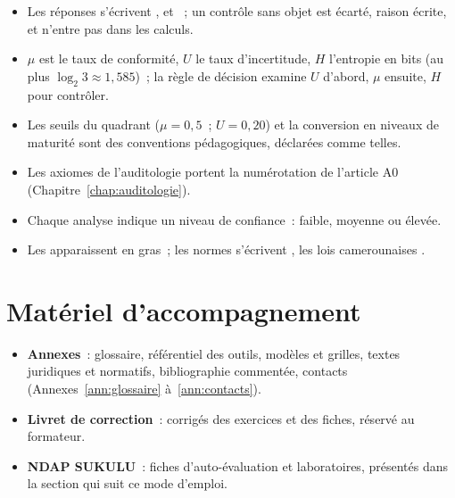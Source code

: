 \begin{itemize}
    \item Les réponses s'écrivent \OUI{}, \NON{} et \NEK{}~; un contrôle sans
          objet est écarté, raison écrite, et n'entre pas dans les calculs.
    \item $\mu$ est le taux de conformité, $U$ le taux d'incertitude, $H$
          l'entropie en bits (au plus $\log_2 3 \approx 1{,}585$)~; la règle
          de décision examine $U$ d'abord, $\mu$ ensuite, $H$ pour contrôler.
    \item Les seuils du quadrant ($\mu = 0{,}5$~; $U = 0{,}20$) et la
          conversion en niveaux de maturité sont des conventions
          pédagogiques, déclarées comme telles.
    \item Les axiomes de l'auditologie portent la numérotation de l'article
          A0 (Chapitre~\ref{chap:auditologie}).
    \item Chaque analyse indique un niveau de confiance~: faible, moyenne ou
          élevée.
    \item Les  apparaissent en gras~; les normes
          s'écrivent , les lois camerounaises
          .
\end{itemize}

\section*{Matériel d'accompagnement}

\begin{itemize}
    \item \textbf{Annexes}~: glossaire, référentiel des outils, modèles et
          grilles, textes juridiques et normatifs, bibliographie commentée,
          contacts (Annexes~\ref{ann:glossaire} à~\ref{ann:contacts}).
    \item \textbf{Livret de correction}~: corrigés des exercices et des
          fiches, réservé au formateur.
    \item \textbf{NDAP SUKULU}~: fiches d'auto-évaluation et laboratoires,
          présentés dans la section qui suit ce mode d'emploi.
\end{itemize}
